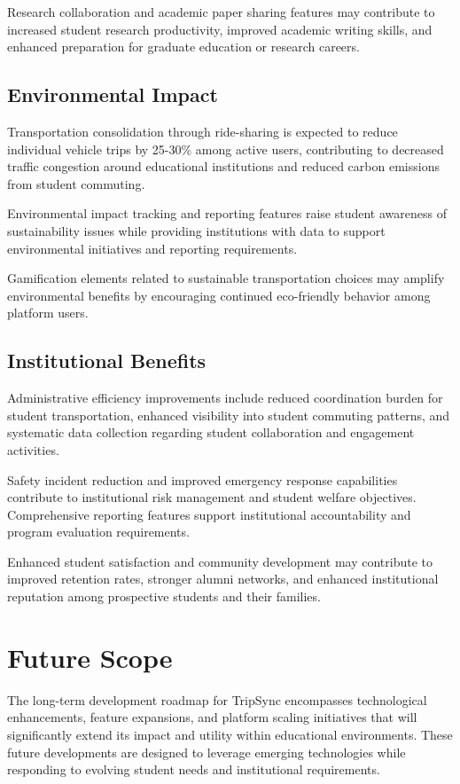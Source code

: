 \documentclass[conference]{IEEEtran}
\begin{document}
Research collaboration and academic paper sharing features may contribute to increased student research productivity, improved academic writing skills, and enhanced preparation for graduate education or research careers.

\subsection{Environmental Impact}

Transportation consolidation through ride-sharing is expected to reduce individual vehicle trips by 25-30\% among active users, contributing to decreased traffic congestion around educational institutions and reduced carbon emissions from student commuting.

Environmental impact tracking and reporting features raise student awareness of sustainability issues while providing institutions with data to support environmental initiatives and reporting requirements.

Gamification elements related to sustainable transportation choices may amplify environmental benefits by encouraging continued eco-friendly behavior among platform users.

\subsection{Institutional Benefits}

Administrative efficiency improvements include reduced coordination burden for student transportation, enhanced visibility into student commuting patterns, and systematic data collection regarding student collaboration and engagement activities.

Safety incident reduction and improved emergency response capabilities contribute to institutional risk management and student welfare objectives. Comprehensive reporting features support institutional accountability and program evaluation requirements.

Enhanced student satisfaction and community development may contribute to improved retention rates, stronger alumni networks, and enhanced institutional reputation among prospective students and their families.

\section{Future Scope}

The long-term development roadmap for TripSync encompasses technological enhancements, feature expansions, and platform scaling initiatives that will significantly extend its impact and utility within educational environments. These future developments are designed to leverage emerging technologies while responding to evolving student needs and institutional requirements.
\end{document}

